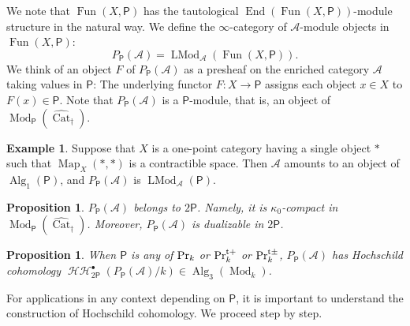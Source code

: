 \documentclass[leqno,12pt]{amsart}
\theoremstyle{plain}
\newtheorem{Proposition}[Theorem]{Proposition}
\theoremstyle{definition}
\newtheorem{Example}[Theorem]{Example}
\newcommand{\HH}{\operatorname{\mathcal{HH}}}
\newcommand{\PR}{\textup{Pr}}
\newcommand{\PRTT}{\textup{Pr}^{\textup{t}+}}
\newcommand{\PRTTT}{\textup{Pr}^{\textup{t}\pm}}
\newcommand{\Mod}{\operatorname{Mod}}
\newcommand{\Map}{\operatorname{Map}}
\newcommand{\Fun}{\operatorname{Fun}}
\newcommand{\Alg}{\operatorname{Alg}}
\newcommand{\End}{\operatorname{End}}
\newcommand{\vCat}{\widehat{\operatorname{Cat}}_\dagger}
\newcommand{\LMod}{\operatorname{LMod}}
\begin{document}
We note that
$\Fun(X,\mathsf{P})$ has the tautological $\End(\Fun(X,\mathsf{P}))$-module structure in the natural way.
We define the $\infty$-category of $\mathcal{A}$-module objects in $\Fun(X,\mathsf{P})$:
\[
P_{\mathsf{P}}(\mathcal{A})=\LMod_{\mathcal{A}}(\Fun(X,\mathsf{P})).
\]
We think of an object $F$ of $P_{\mathsf{P}}(\mathcal{A})$ as a presheaf on the enriched category $\mathcal{A}$
taking values in $\mathsf{P}$: The underlying functor $F:X\to \mathsf{P}$ assigns each object $x\in X$ to $F(x)\in \mathsf{P}$.
Note that  $P_{\mathsf{P}}(\mathcal{A})$ is a $\mathsf{P}$-module, that is, an object of $\Mod_{\mathsf{P}}(\vCat)$.

\begin{Example}
\label{exendoalg}
Suppose that $X$ is a one-point category having a single object $\ast$ such that $\Map_X(\ast,\ast)$ is a contractible space.
Then $\mathcal{A}$ amounts to an object of $\Alg_1(\mathsf{P})$, and $P_{\mathsf{P}}(\mathcal{A})$ is $\LMod_{\mathcal{A}}(\mathsf{P})$.

\end{Example}

\begin{Proposition}
\label{enrichdual}
$P_{\mathsf{P}}(\mathcal{A})$ belongs to $2\mathsf{P}$. Namely, it is $\kappa_0$-compact in $\Mod_{\mathsf{P}}(\vCat)$. Moreover, $P_{\mathsf{P}}(\mathcal{A})$ is dualizable in $2\mathsf{P}$.
\end{Proposition}

\begin{Proposition}
\label{enrichhoch}
When $\mathsf{P}$ is any of $\PR_k$ or $\PRTT_k$ or $\PRTTT_k$, $P_{\mathsf{P}}(\mathcal{A})$ has Hochschild cohomology $\HH^\bullet_{2\mathsf{P}}(P_{\mathsf{P}}(\mathcal{A})/k)\in \Alg_3(\Mod_k)$.
\end{Proposition}


For applications in any context depending on $\mathsf{P}$, it is important to understand the construction of Hochschild cohomology. We proceed step by step.
\end{document}
